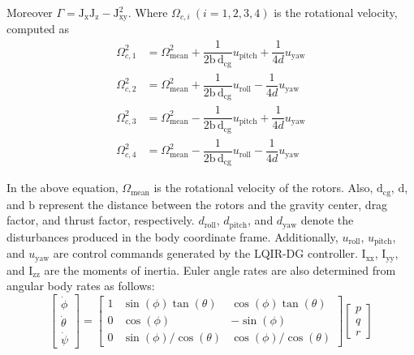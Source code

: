 \documentclass[3p]{elsarticle}
\begin{document}
Moreover $\Gamma = \mathrm{J}_{\text{x}}\mathrm{J}_{\text{z}} - \mathrm{J}_{\text{xy}}^2$.
Where $\Omega_{c, i}~(i=1, 2, 3, 4)$ is the rotational velocity, computed as
 \begin{align}
    \Omega_{c, 1}^2 &= \Omega_{\text{mean}}^2 + \dfrac{1}{2\mathrm{b\,d}_{\text{cg}}}u_{\text{pitch}} + \dfrac{1}{4d}u_{\text{yaw}} \\
    \Omega_{c, 2}^2 &= \Omega_{\text{mean}}^2 + \dfrac{1}{2\mathrm{b\,d}_{\text{cg}}}u_{\text{roll}} - \dfrac{1}{4d}u_{\text{yaw}}\\
    \Omega_{c, 3}^2 &= \Omega_{\text{mean}}^2 - \dfrac{1}{2\mathrm{b\,d}_{\text{cg}}}u_{\text{pitch}} + \dfrac{1}{4d}u_{\text{yaw}} \\
    \Omega_{c, 4}^2 &= \Omega_{\text{mean}}^2 - \dfrac{1}{2\mathrm{b\,d}_{\text{cg}}}u_{\text{roll}} - \dfrac{1}{4d}u_{\text{yaw}}
\end{align}

In the above equation, $\Omega_{\text{mean}}$ is the rotational velocity of the rotors. Also, $\mathrm{d}_{\text{cg}}$, $\text{d}$, and $\text{b}$ represent the distance between the rotors and the gravity center, drag factor, and thrust factor, respectively.
$d_{\text{roll}}$, $d_{\text{pitch}}$, and $d_{\text{yaw}}$ denote the disturbances produced in the body coordinate frame. Additionally,
$u_{\text{roll}}$, $u_{\text{pitch}}$, and $u_{\text{yaw}}$ are control commands generated by the LQIR-DG controller.
 $\mathrm{I}_{\text{xx}}$, $\mathrm{I}_{\text{yy}}$, and $\mathrm{I}_{\text{zz}}$ are the moments of inertia.
Euler angle rates are also determined from angular body rates as follows:
\begin{equation}
    \begin{bmatrix}
    \dot\phi \\
    \dot\theta \\
    \dot\psi
    \end{bmatrix} = 
    \begin{bmatrix}
    1 & \sin(\phi)\tan(\theta) & \cos(\phi)\tan(\theta) \\
    0 & \cos(\phi) & -\sin(\phi) \\
    0 & \sin(\phi)/\cos(\theta) & \cos(\phi)/\cos(\theta)
    \end{bmatrix}
    \begin{bmatrix}
    p \\
    q \\
    r
    \end{bmatrix}
\end{equation}
\end{document}
